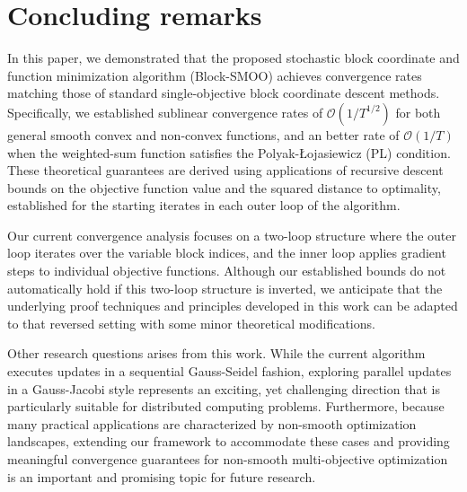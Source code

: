\documentclass[11pt,a4paper]{article}
\numberwithin{equation}{section}%
\renewcommand{\(}{\left (}
\renewcommand{\)}{\right )}
\begin{document}

\section{Concluding remarks}\label{sec:con}

In this paper, we demonstrated that the proposed stochastic block coordinate and function minimization algorithm (Block-SMOO) achieves convergence rates matching those of standard single-objective block coordinate descent methods. Specifically, we established sublinear convergence rates of $\mathcal{O}(1/T^{1/2})$ for both general smooth convex and non-convex functions, and an better rate of $\mathcal{O}(1/T)$ when the weighted-sum function satisfies the Polyak-Łojasiewicz (PL) condition. These theoretical guarantees are derived using applications of recursive descent bounds on the objective function value and the squared distance to optimality, established for the starting iterates in each outer loop of the algorithm.

Our current convergence analysis focuses on a two-loop structure where the outer loop iterates over the variable block indices, and the inner loop applies gradient steps to individual objective functions. Although our established bounds do not automatically hold if this two-loop structure is inverted, we anticipate that the underlying proof techniques and principles developed in this work can be adapted to that reversed setting with some minor theoretical modifications.

Other research questions arises from this work. While the current algorithm executes updates in a sequential Gauss-Seidel fashion, exploring parallel updates in a Gauss-Jacobi style represents an exciting, yet challenging direction that is particularly suitable for distributed computing problems. Furthermore, because many practical applications are characterized by non-smooth optimization landscapes, extending our framework to accommodate these cases and providing meaningful convergence guarantees for non-smooth multi-objective optimization is an important and promising topic for future research.
\end{document}
